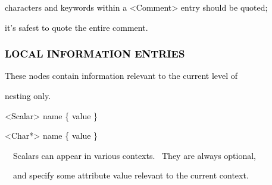 \documentclass[a4paper]{article}
\newcommand\textstyleOOoComputerKeyWord[1]{\textrm{\textcolor[rgb]{0.0,0.0,0.5019608}{#1}}}
\newcommand\textstyleOOoAssemblerSpecialChar[1]{\textrm{\textcolor[rgb]{0.0,0.5019608,0.0}{#1}}}
\newcommand\textstyleOOoAssemblerIdent[1]{\textrm{\textcolor{black}{#1}}}
\newcommand\textstyleOOoAssemblerDirective[1]{\textrm{\textcolor[rgb]{0.0,0.5019608,1.0}{#1}}}
\begin{document}
{\color{black}
\textstyleOOoComputerKeyWord{\textcolor{black}{characters and keywords within a {\textless}Comment{\textgreater} entry
should be quoted;}}}

{\color{black}
\textstyleOOoComputerKeyWord{\textcolor{black}{it's safest to quote the entire comment.}}}


\bigskip


\bigskip

\clearpage
\bigskip

\subsubsection[LOCAL INFORMATION ENTRIES]{\textstyleOOoComputerKeyWord{\textcolor{black}{LOCAL INFORMATION ENTRIES}}}
\hypertarget{RefHeading7674869075401}{}
\bigskip

{\color{black}
\textstyleOOoComputerKeyWord{\textcolor{black}{These nodes contain information relevant to the current level of}}}

{\color{black}
\textstyleOOoComputerKeyWord{\textcolor{black}{nesting only.}}}


\bigskip

{\color{black}
\textstyleOOoAssemblerSpecialChar{{\textless}}\textstyleOOoAssemblerIdent{Scalar}\textstyleOOoAssemblerSpecialChar{{\textgreater}}\textstyleOOoComputerKeyWord{\textcolor{black}{
}}\textstyleOOoAssemblerDirective{name}\textstyleOOoComputerKeyWord{\textcolor{black}{
}}\textstyleOOoAssemblerSpecialChar{\{}\textstyleOOoComputerKeyWord{\textcolor{black}{
}}\textstyleOOoAssemblerIdent{value}\textstyleOOoComputerKeyWord{\textcolor{black}{
}}\textstyleOOoAssemblerSpecialChar{\}}}

{\color{black}
\textstyleOOoAssemblerSpecialChar{{\textless}}\textstyleOOoAssemblerIdent{Char}\textstyleOOoAssemblerSpecialChar{*{\textgreater}}\textstyleOOoComputerKeyWord{\textcolor{black}{
}}\textstyleOOoAssemblerDirective{name}\textstyleOOoComputerKeyWord{\textcolor{black}{
}}\textstyleOOoAssemblerSpecialChar{\{}\textstyleOOoComputerKeyWord{\textcolor{black}{
}}\textstyleOOoAssemblerIdent{value}\textstyleOOoComputerKeyWord{\textcolor{black}{
}}\textstyleOOoAssemblerSpecialChar{\}}}


\bigskip

{\color{black}
\textstyleOOoComputerKeyWord{\textcolor{black}{\ \ Scalars can appear in various contexts. \ They are always
optional,}}}

{\color{black}
\textstyleOOoComputerKeyWord{\textcolor{black}{\ \ and specify some attribute value relevant to the current context.}}}
\end{document}
